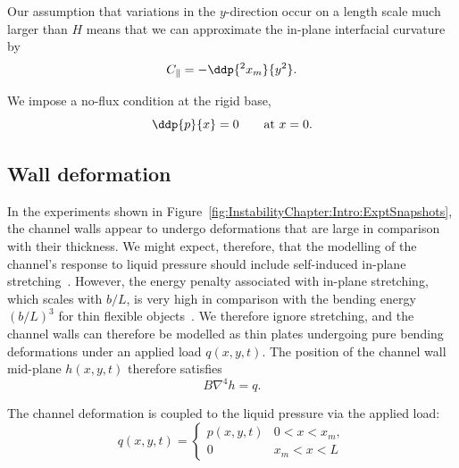 Our assumption that variations in the $y$-direction occur on a length scale much larger than $H$ means that we can approximate the in-plane interfacial curvature by
\begin{equation}\label{E:InstabilityChapter:Model:Liquid:CParallel}
C_{\parallel} = -\ddp{^2 x_m}{y^2}.
\end{equation}

We impose a no-flux condition at the rigid base,
\begin{equation}\label{E:InstabilityChapter:Model:Liquid:nofluxBC}
\ddp{p}{x}=0 \qquad \text{at}~x =0.
\end{equation}

\subsection{Wall deformation}
In the experiments shown in  Figure~\ref{fig:InstabilityChapter:Intro:ExptSnapshots}, the channel walls appear to undergo deformations that are large in comparison with their thickness.  We might expect, therefore, that the modelling of the channel's response to liquid pressure should include self-induced in-plane stretching~\citep{Timoshenko1959}. However, the energy penalty associated with in-plane stretching, which scales with $b/L$, is very high in comparison with the bending energy $(b/L)^3$ for thin flexible objects~\citep{Pini2016SciRep}. We therefore ignore stretching, and the channel walls can therefore be modelled as thin plates undergoing pure bending deformations under an applied load $q(x,y,t)$. The position of the channel wall mid-plane $h(x,y,t)$ therefore satisfies~\citep{Timoshenko1959}
\begin{equation}\label{E:InstabilityChapter:Model:Wall:Bilaplacian}
B\nabla^4 h = q.
\end{equation}

The channel deformation is coupled to the liquid pressure via the applied load:
\begin{equation}\label{E:InstabilityChapter:Model:Wall:BilaplacianPressure}
q(x,y,t) = \left\{\begin{array}{ll}  p(x,y,t) & 0 < x< x_m,\\ 0 & x_m < x < L
\end{array}\right.
\end{equation}

